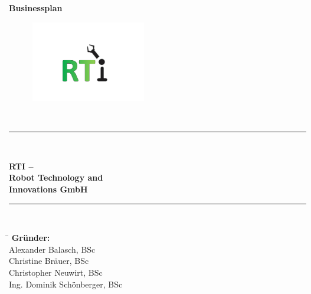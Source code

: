 \begin{titlepage}
	\textbf{{\LARGE Businessplan}}\\
	\begin{figure}[h]
		\centering
		\includegraphics[width=5cm]{Images/Logo.pdf}
	\end{figure}\\
	\rule{15cm}{0.3mm}\\
	\begin{minipage}[c][4cm][c]{\textwidth}
		\centering
		\textbf{\Huge RTI --}\\
		\vspace{\baselineskip}
		\textbf{\Huge Robot Technology and}\\
		\vspace{0.5\baselineskip}
		\textbf{\Huge Innovations GmbH}
		
	\end{minipage}
	\rule{15cm}{0.3mm}
	\vspace{2\baselineskip}\\
	\begin{tabbing}
		\hspace{2cm}\=\kill
		\textbf{Gründer:}\> \\ 
		\>Alexander Balasch, BSc \\ 
		\>Christine Bräuer, BSc \\
		\>Christopher Neuwirt, BSc \\ 
		\>Ing. Dominik Schönberger, BSc 
	\end{tabbing} 

\end{titlepage}